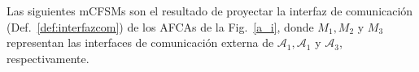 \begin{ejemplo} 
\label{def:interfazcom}
%
%    
%
%

Las siguientes mCFSMs son el resultado de proyectar la interfaz de comunicación (Def.~\ref{def:interfazcom}) de los AFCAs de la Fig.~\ref{a_i}, donde $M_1, M_2$ y $M_3$ representan las interfaces de comunicación externa de $\mathcal{A}_1, \mathcal{A}_1$ y $\mathcal{A}_3$, respectivamente.
\begin{figure}[H]
\begin{center}
\end{center}
\end{figure}
\end{ejemplo}
